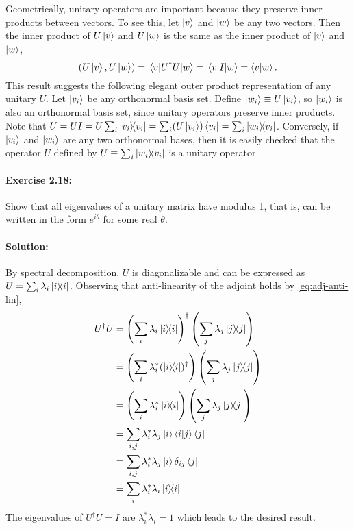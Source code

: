 Geometrically, unitary operators are important because they preserve inner
products between vectors. To see this, let $\ket{v}$ and $\ket{w}$ be any two
vectors. Then the inner product of $U\ket{v}$ and $U\ket{w}$ is the same as the
inner product of $\ket{v}$ and $\ket{w}$, \begin{equation*}
  (U\ket{v}, U\ket{w}) = \mel{v}{U^\dagger U}{w} = \mel{v}{I}{w} =
    \braket{v}{w}.
\end{equation*} This result suggests the following elegant outer product
representation of any unitary $U$. Let $\ket{v_i}$ be any orthonormal basis
set. Define $\ket{w_i} \equiv U\ket{v_i}$, so $\ket{w_i}$ is also an
orthonormal basis set, since unitary operators preserve inner products. Note
that $U = UI = U\sum_i \ketbra{v_i}{v_i} = \sum_i (U\ket{v_i})\bra{v_i} =
\sum_i \ketbra{w_i}{v_i}$. Conversely, if $\ket{v_i}$ and $\ket{w_i}$ are any
two orthonormal bases, then it is easily checked that the operator $U$ defined
by $U \equiv \sum_i \ketbra{w_i}{v_i}$ is a unitary operator.

\paragraph{\cite{mikeandike} Exercise 2.18:} Show that all eigenvalues of a
unitary matrix have modulus 1, that is, can be written in the form
$e^{i\theta}$ for some real $\theta$.

\paragraph{Solution:} By spectral decomposition, $U$ is diagonalizable and can
be expressed as $U = \sum_i \lambda_i \ketbra{i}{i}$. Observing that
anti-linearity of the adjoint holds by \eqref{eq:adj-anti-lin}, \begin{align*}
  U^\dagger U
    &= \left(\sum_i \lambda_i \ketbra{i}{i}\right)^\dagger \left(\sum_j
      \lambda_j \ketbra{j}{j}\right) \\
    &= \left(\sum_i \lambda_i^* (\ketbra{i}{i})^\dagger\right) \left(\sum_j
      \lambda_j \ketbra{j}{j}\right) \\
    &= \left(\sum_i \lambda_i^*\ketbra{i}{i}\right) \left(\sum_j \lambda_j
      \ketbra{j}{j}\right) \\
    &= \sum_{i,j} \lambda_i^*\lambda_j\ket{i}\braket{i}{j}\bra{j} \\
    &= \sum_{i,j} \lambda_i^*\lambda_j\ket{i}\delta_{ij}\bra{j} \\
    &= \sum_i \lambda_i^*\lambda_i\ketbra{i}{i}
\end{align*}
The eigenvalues of $U^\dagger U = I$ are $\lambda_i^*\lambda_i = 1$ which leads
to the desired result.

